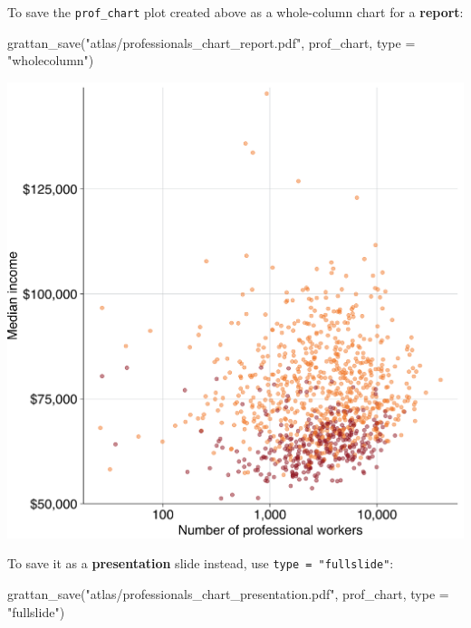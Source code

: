 \documentclass[
]{book}
\newenvironment{Shaded}{\begin{snugshade}}{\end{snugshade}}
\newcommand{\AttributeTok}[1]{\textcolor[rgb]{0.77,0.63,0.00}{#1}}
\newcommand{\FunctionTok}[1]{\textcolor[rgb]{0.00,0.00,0.00}{#1}}
\newcommand{\NormalTok}[1]{#1}
\newcommand{\StringTok}[1]{\textcolor[rgb]{0.31,0.60,0.02}{#1}}
\begin{document}
To save the \texttt{prof\_chart} plot created above as a whole-column chart for a \textbf{report}:

\begin{Shaded}
\begin{Highlighting}[]
\FunctionTok{grattan\_save}\NormalTok{(}\StringTok{"atlas/professionals\_chart\_report.pdf"}\NormalTok{, prof\_chart, }\AttributeTok{type =} \StringTok{"wholecolumn"}\NormalTok{)}
\end{Highlighting}
\end{Shaded}

\includegraphics[width=38.76in]{atlas/professionals_chart_report}

To save it as a \textbf{presentation} slide instead, use \texttt{type\ =\ "fullslide"}:

\begin{Shaded}
\begin{Highlighting}[]
\FunctionTok{grattan\_save}\NormalTok{(}\StringTok{"atlas/professionals\_chart\_presentation.pdf"}\NormalTok{, prof\_chart, }\AttributeTok{type =} \StringTok{"fullslide"}\NormalTok{)}
\end{Highlighting}
\end{Shaded}
\end{document}
